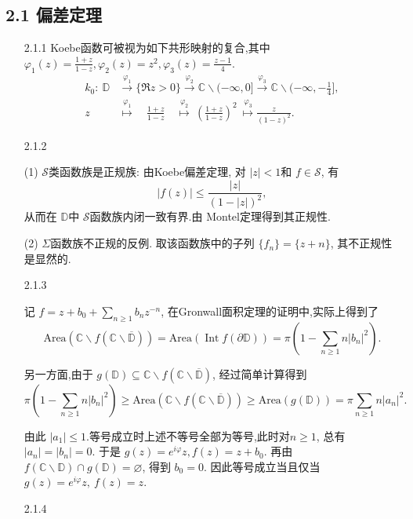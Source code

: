 \subsection*{2.1 偏差定理}
\begin{itemize}
    \item[2.1.1]
Koebe函数可被视为如下共形映射的复合,其中 
$\varphi_1(z) = \frac{1+z}{1-z},\varphi_2(z) = z^2, \varphi_3(z) = \frac{z-1}{4}$.
\begin{align*}
    k_0: \ \mathbb{D} 
    &\stackrel{\varphi_1}\longrightarrow \{ \Re z>0 \} 
    \stackrel{\varphi_2}\longrightarrow \mathbb{C}\backslash (-\infty,0]
    \stackrel{\varphi_3}\longrightarrow \mathbb{C}\backslash (-\infty,-\frac{1}{4}],\\
    z &\stackrel{\varphi_1}\longmapsto \quad\frac{1+z}{1-z}\quad
    \stackrel{\varphi_2}\longmapsto \ \left( \frac{1+z}{1-z} \right)^2\ 
    \stackrel{\varphi_3}\longmapsto \frac{z}{(1-z)^2}.
\end{align*}

    \item[2.1.2]

(1) $\mathcal{S}$类函数族是正规族: 由Koebe偏差定理, 对 $|z|<1$和 $f \in \mathcal{S}$, 有
$$|f(z)|\le \frac{|z|}{(1-|z|)^2},$$
从而在 $\mathbb{D}$中 $\mathcal{S}$函数族内闭一致有界.由 Montel定理得到其正规性.

(2) $\Sigma$函数族不正规的反例. 取该函数族中的子列 $\{f_n\}=\{z+n\}$, 其不正规性是显然的.

    \item[2.1.3]

记 $f = z+b_0 + \sum_{n\ge 1}b_n z^{-n}$, 在Gronwall面积定理的证明中,实际上得到了
$$\text{Area}(\mathbb{C}\backslash f(\mathbb{C}\backslash \overline{\mathbb{D}}))
=\text{Area}(\operatorname{Int}f(\partial \mathbb{D})) 
= \pi (1-\sum_{n\ge 1}n|b_n|^2).$$

另一方面,由于 $g(\mathbb{D})\subseteq \mathbb{C}
\backslash f(\mathbb{C}\backslash \overline{\mathbb{D}})$, 经过简单计算得到
$$\pi (1-\sum_{n\ge 1}n|b_n|^2) 
\ge  \text{Area}(\mathbb{C}\backslash f(\mathbb{C}\backslash \overline{\mathbb{D}}))
\ge \text{Area}(g(\mathbb{D}))= \pi\sum_{n\ge 1}n|a_n|^2.$$

由此 $|a_1|\le 1$.等号成立时上述不等号全部为等号,此时对$n\ge 1$,
总有 $|a_{n}| = |b_n| = 0$. 于是 $g(z) = e^{i\varphi}z, f(z) = z+b_{0}$. 
再由 $f(\mathbb{C}\backslash \mathbb{D})\cap g(\mathbb{D}) = \varnothing$, 
得到 $b_0=0$. 因此等号成立当且仅当 $g(z) = e^{i\varphi}z,\ f(z) = z$.


    \item[2.1.4]


\end{itemize}

